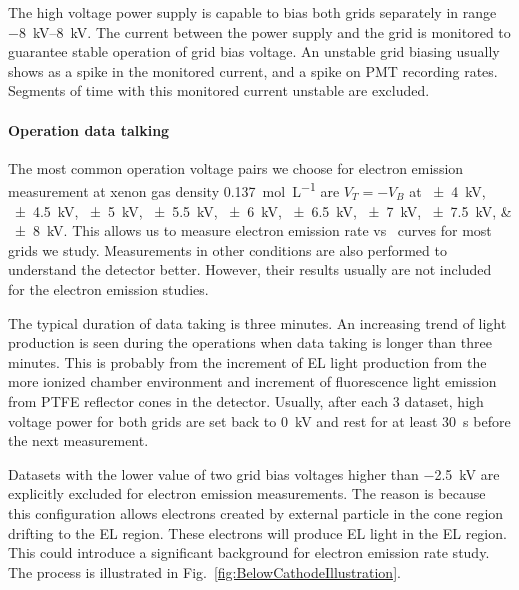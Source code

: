 The high voltage power supply is capable to bias both grids separately in range \SIrange{-8}{8}{\kV}. The current between the power supply and the grid is monitored to guarantee stable operation of grid bias voltage. An unstable grid biasing usually shows as a spike in the monitored current, and a spike on PMT recording rates. Segments of time with this monitored current unstable are excluded.  

\paragraph{Operation data talking} %
The most common operation voltage pairs we choose for electron emission measurement at xenon gas density \SI{0.137}{\mole\per\liter} are $V_{T}=-V_{B} $ at \SIlist{\pm 4; \pm 4.5; \pm 5; \pm 5.5;\pm 6; \pm 6.5;\pm 7; \pm 7.5;\pm 8}{\kV}. This allows us to measure electron emission rate vs \opdv\ curves for most grids we study. Measurements in other conditions are also performed to understand the detector better. However, their results usually are not included for the electron emission studies.

The typical duration of data taking is three minutes. An increasing trend of light production is seen during the operations when data taking is longer than three minutes. This is probably from the increment of EL light production from the more ionized chamber environment and increment of fluorescence light emission from PTFE reflector cones in the detector. Usually, after each \SI{3}{\min} dataset, high voltage power for both grids are set back to \SI{0}{\kV} and rest for at least \SI{30}{\s} before the next measurement. 

Datasets with the lower value of two grid bias voltages higher than \SI{-2.5}{\kV} are explicitly excluded for electron emission measurements. The reason is because this configuration allows electrons created by external particle in the cone region drifting to the EL region. These electrons will produce EL light in the EL region. This could introduce a significant background for electron emission rate study. The process is illustrated in Fig.~\ref{fig:BelowCathodeIllustration}.

